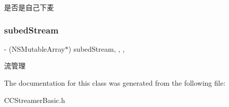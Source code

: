 是否是自己下麦 \mbox{\label{interface_c_c_streamer_basic_aa37da66cdd8a8790bfafd4b7bd5cac1d}} 
\subsubsection{\texorpdfstring{subed\+Stream}{subedStream}}
{\footnotesize\ttfamily -\/ (N\+S\+Mutable\+Array$\ast$) subed\+Stream\hspace{0.3cm}{\ttfamily [read]}, {\ttfamily [write]}, {\ttfamily [nonatomic]}, {\ttfamily [strong]}}

流管理 

The documentation for this class was generated from the following file\+:\begin{DoxyCompactItemize}
\item 
C\+C\+Streamer\+Basic.\+h\end{DoxyCompactItemize}

